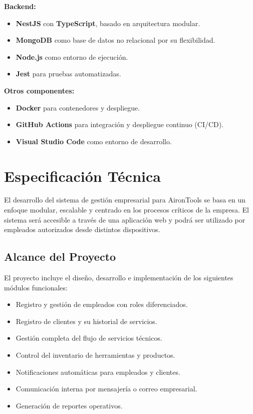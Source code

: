 \textbf{Backend:}
\begin{itemize}
	\item \textbf{NestJS} con \textbf{TypeScript}, basado en arquitectura modular.
	\item \textbf{MongoDB} como base de datos no relacional por su flexibilidad.
	\item \textbf{Node.js} como entorno de ejecución.
	\item \textbf{Jest} para pruebas automatizadas.
\end{itemize}

\textbf{Otros componentes:}
\begin{itemize}
	\item \textbf{Docker} para contenedores y despliegue.
	\item \textbf{GitHub Actions} para integración y despliegue continuo (CI/CD).
	\item \textbf{Visual Studio Code} como entorno de desarrollo.
\end{itemize}








\section{Especificación Técnica}

El desarrollo del sistema de gestión empresarial para AironTools se basa en un enfoque modular, escalable y centrado en los procesos críticos de la empresa. El sistema será accesible a través de una aplicación web y podrá ser utilizado por empleados autorizados desde distintos dispositivos.

\subsection{Alcance del Proyecto}

El proyecto incluye el diseño, desarrollo e implementación de los siguientes módulos funcionales:

\begin{itemize}
	\item Registro y gestión de empleados con roles diferenciados.
	\item Registro de clientes y su historial de servicios.
	\item Gestión completa del flujo de servicios técnicos.
	\item Control del inventario de herramientas y productos.
	\item Notificaciones automáticas para empleados y clientes.
	\item Comunicación interna por mensajería o correo empresarial.
	\item Generación de reportes operativos.
\end{itemize}

